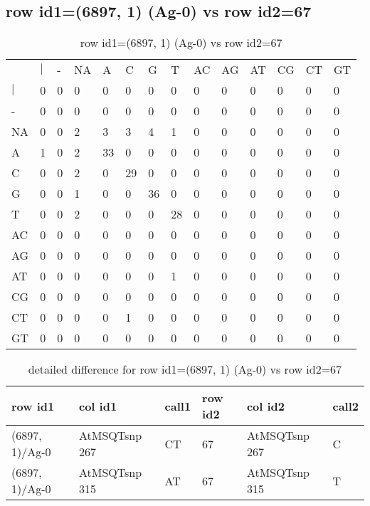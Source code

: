 \subsection{row id1=(6897, 1) (Ag-0) vs row id2=67}
\begin{center}
\begin{longtable}{|l|l|l|l|l|l|l|l|l|l|l|l|l|l|}
\caption{row id1=(6897, 1) (Ag-0) vs row id2=67} \label{table_dm56}\\
\hline
\\
\hline
&$|$&-&NA&A&C&G&T&AC&AG&AT&CG&CT&GT\\
$|$&0&0&0&0&0&0&0&0&0&0&0&0&0\\
-&0&0&0&0&0&0&0&0&0&0&0&0&0\\
NA&0&0&2&3&3&4&1&0&0&0&0&0&0\\
A&1&0&2&33&0&0&0&0&0&0&0&0&0\\
C&0&0&2&0&29&0&0&0&0&0&0&0&0\\
G&0&0&1&0&0&36&0&0&0&0&0&0&0\\
T&0&0&2&0&0&0&28&0&0&0&0&0&0\\
AC&0&0&0&0&0&0&0&0&0&0&0&0&0\\
AG&0&0&0&0&0&0&0&0&0&0&0&0&0\\
AT&0&0&0&0&0&0&1&0&0&0&0&0&0\\
CG&0&0&0&0&0&0&0&0&0&0&0&0&0\\
CT&0&0&0&0&1&0&0&0&0&0&0&0&0\\
GT&0&0&0&0&0&0&0&0&0&0&0&0&0\\
\hline
\end{longtable}
\end{center}

\begin{center}
\begin{longtable}{|l|l|l|l|l|l|}
\caption{detailed difference for row id1=(6897, 1) (Ag-0) vs row id2=67} \label{table_dm57}\\
\hline
row id1&col id1&call1&row id2&col id2&call2\\
\hline
(6897, 1)/Ag-0&AtMSQTsnp 267&CT&67&AtMSQTsnp 267&C\\
(6897, 1)/Ag-0&AtMSQTsnp 315&AT&67&AtMSQTsnp 315&T\\
\hline
\end{longtable}
\end{center}

